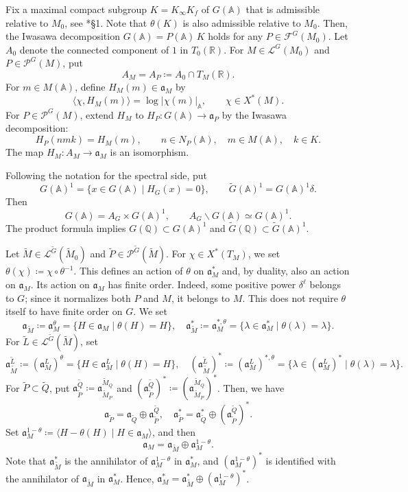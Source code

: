 \documentclass[12pt]{amsart}
\theoremstyle{definition}
\theoremstyle{plain}
\theoremstyle{remark}
\def\R{\mathbb{R}}%
\def\Q{\mathbb{Q}}%
\def\A{\mathbb{A}}%
\newcommand{\fa}{\mathfrak{a}}
\newcommand{\cF}{\mathcal{F}}
\newcommand{\cL}{\mathcal{L}}
\newcommand{\cP}{\mathcal{P}}
\numberwithin{equation}{section}
\newcommand{\tG}{\widetilde{G}}
\newcommand{\tM}{\widetilde{M}}
\newcommand{\tL}{\widetilde{L}}
\newcommand{\tP}{\widetilde{P}}
\newcommand{\tQ}{\widetilde{Q}}
\begin{document}
Fix a maximal compact subgroup $K=K_\infty K_f$ of $G(\A)$
that is admissible relative to $M_0$, see \cite{Art81}*{\S1}. 
Note that $\theta(K)$ is also admissible relative to $M_0$. 
Then, the Iwasawa decomposition $G(\A)=P(\A)\, K$ holds for any $P\in\cF^G(M_0)$. 
Let $A_0$ denote the connected component of $1$ in $T_0(\R)$. 
For $M\in \cL^G(M_0)$ and $P\in\cP^G(M)$, put
\[
   A_M=A_P\coloneqq A_0\cap T_M(\R).
\]
For $m\in M(\A)$, define $H_M(m)\in\fa_M$ by
\[
  \langle\chi,H_M(m)\rangle=\log|\chi(m)|_{\A},
  \qquad \chi\in X^*(M).
\]
For $P\in\cP^G(M)$, extend $H_M$ to $H_P\colon G(\A)\to\fa_P$
by the Iwasawa decomposition:
\[
  H_P(nmk)=H_M(m),
  \qquad n\in N_P(\A),\quad m\in M(\A),\quad k\in K.
\]
The map $H_M\colon A_M\to\fa_M$ is an isomorphism.

Following the notation for the spectral side, put
\begin{equation*}
  G(\A)^1=\{x\in G(\A)\mid H_G(x)=0\},
  \qquad \tG(\A)^1=G(\A)^1\delta.
  \label{eq:lw911-norm-one}
\end{equation*}
Then
\[
  G(\A)=A_G\times G(\A)^1,
  \qquad A_G\backslash G(\A)\simeq G(\A)^1.
\]
The product formula implies $G(\Q)\subset G(\A)^1$ and
$\tG(\Q)\subset\tG(\A)^1$.



Let $\tM\in\cL^{\tG}(\tM_0)$ and $\tP\in \cP^{\tG}(\tM)$.
For $\chi\in X^*(T_M)$, we set $\theta(\chi)\coloneqq\chi\circ\theta^{-1}$. 
This defines an action of $\theta$ on $\fa_M^*$ and, by duality, also an action on $\fa_M$.
Its action on $\fa_M$ has finite order.
Indeed, some positive power $\delta^\ell$ belongs to $G$;
since it normalizes both $P$ and $M$, it belongs to $M$.
This does not require $\theta$ itself to have finite order on $G$.
We set
\[
  \fa_{\tM}\coloneqq \fa_M^\theta=\{H\in \fa_M \mid \theta(H)=H \},\quad 
  \fa_{\tM}^*\coloneqq \fa_M^{*,\theta}=\{\lambda\in \fa_M^* \mid \theta(\lambda)=\lambda \}.
\]
For $\tL\in\cL^{\tG}(\tM)$, set
\[
  \fa_{\tM}^{\tL}\coloneqq (\fa_M^L)^\theta=\{H\in \fa_M^L \mid \theta(H)=H \},\quad 
  (\fa_{\tM}^{\tL})^*\coloneqq (\fa_M^L)^{*,\theta}=\{\lambda\in (\fa_M^L)^* \mid \theta(\lambda)=\lambda \}.
\]
For $\tP\subset\tQ$, put $\fa_{\tP}^{\tQ}\coloneqq \fa_{\tM_P}^{\tM_Q}$ and $(\fa_{\tP}^{\tQ})^*\coloneqq (\fa_{\tM_P}^{\tM_Q})^*$.
Then, we have
\[
\fa_{\tP}=\fa_{\tQ}\oplus \fa_{\tP}^{\tQ}, \quad \fa_{\tP}^*=\fa_{\tQ}^*\oplus (\fa_{\tP}^{\tQ})^*.
\]
Set $\fa_M^{1-\theta}\coloneqq \langle H-\theta(H)\mid H\in\fa_M\rangle$, and then 
\begin{equation*}
  \fa_M=\fa_{\tM}\oplus \fa_M^{1-\theta}.
  \label{eq:lw911-central-assumption}
\end{equation*}
Note that $\fa_{\tM}^*$ is the annihilator of $\fa_M^{1-\theta}$ in $\fa_M^*$, and $(\fa_M^{1-\theta})^*$ is identified with the annihilator of $\fa_{\tM}$ in $\fa_M^*$. 
Hence, $\fa_M^*=\fa_{\tM}^*\oplus (\fa_M^{1-\theta})^*$. 
\end{document}
